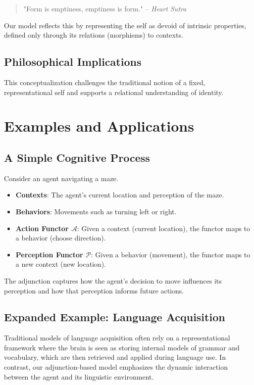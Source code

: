\documentclass{article}
\begin{document}
\begin{quote} "Form is emptiness, emptiness is form." -- \textit{Heart Sutra} \end{quote}

Our model reflects this by representing the self as devoid of intrinsic properties, defined only through its relations (morphisms) to contexts.

\subsection{Philosophical Implications}

This conceptualization challenges the traditional notion of a fixed, representational self and supports a relational understanding of identity.

\section{Examples and Applications}

\subsection{A Simple Cognitive Process}

Consider an agent navigating a maze.

\begin{itemize} \item \textbf{Contexts}: The agent's current location and perception of the maze. \item \textbf{Behaviors}: Movements such as turning left or right. \item \textbf{Action Functor $\mathcal{A}$}: Given a context (current location), the functor maps to a behavior (choose direction). \item \textbf{Perception Functor $\mathcal{P}$}: Given a behavior (movement), the functor maps to a new context (new location). \end{itemize}

The adjunction captures how the agent's decision to move influences its perception and how that perception informs future actions.

\subsection{Expanded Example: Language Acquisition}

Traditional models of language acquisition often rely on a representational framework where the brain is seen as storing internal models of grammar and vocabulary, which are then retrieved and applied during language use. In contrast, our adjunction-based model emphasizes the dynamic interaction between the agent and its linguistic environment.
\end{document}

